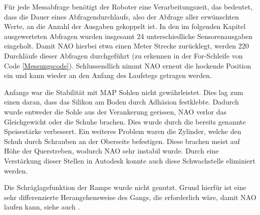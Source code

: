 Für jede Messabfrage benötigt der Roboter eine Verarbeitungszeit, das bedeutet, dass die Dauer eines Abfragendurchlaufs, also der Abfrage aller erwünschten Werte, an die Anzahl der Ausgaben gekoppelt ist. In den im folgenden Kapitel ausgewerteten Abfragen wurden insgesamt 24 unterschiedliche Sensorenausgaben eingeholt. Damit NAO hierbei etwa einen Meter Strecke zurücklegt, werden 220 Durchläufe dieser Abfragen durchgeführt (zu erkennen in der For-Schleife von Code \ref{Messungscode}). Schlussendlich nimmt NAO erneut die hockende Position ein und kann wieder an den Anfang des Laufstegs getragen werden. 

Anfangs war die Stabilität mit MAP Sohlen nicht gewährleistet. Dies lag zum einen daran, dass das Silikon am Boden durch Adhäsion festklebte. Dadurch wurde entweder die Sohle aus der Verankerung gerissen, NAO verlor das Gleichgewicht oder die Schuhe brachen. Dies wurde durch die bereits genannte Speisestärke verbessert. Ein weiteres Problem waren die Zylinder, welche den Schuh durch Schrauben an der Oberseite befestigen. Diese brachen meist auf Höhe der Querstreben, wodurch NAO sehr instabil wurde. Durch eine Verstärkung dieser Stellen in Autodesk konnte auch diese Schwachstelle eliminiert werden. 

Die Schräglagefunktion der Rampe wurde nicht genutzt. Grund hierfür ist eine sehr differenzierte Herangehensweise des Gangs, die erforderlich wäre, damit NAO laufen kann, siehe auch \cite{Lutz_naowalking}.



